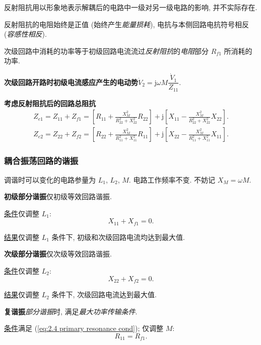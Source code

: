 反射阻抗用以形象地表示解耦后的电路中一级对另一级电路的影响, 并不实际存在.

反射阻抗的电阻始终是正值 (始终产生\textit{能量损耗}), 电抗与本侧回路电抗符号相反 (\textit{容感性相反}).

次级回路中消耗的功率等于初级回路电流流过\textit{反射阻抗}的\textit{电阻}部分 $R_{f1}$ 所消耗的功率.

\textbf{次级回路开路时初级电流感应产生的电动势}\quad $\dot{V}_2=\mathrm{j}\omega M\dfrac{\dot{V}_1}{Z_{11}}$.

\textbf{考虑反射阻抗后的回路总阻抗}
\begin{gather}
    Z_{e1}=Z_{11}+Z_{f1}=\left[R_{11}+\frac{X_M^2}{R_{22}^2+X_{22}^2}R_{22}\right]+\mathrm{j}\left[X_{11}-\frac{X_M^2}{R_{22}^2+X_{22}^2}X_{22}\right]. \\
    Z_{e2}=Z_{22}+Z_{f2}=\left[R_{22}+\frac{X_M^2}{R_{11}^2+X_{11}^2}R_{11}\right]+\mathrm{j}\left[X_{22}-\frac{X_M^2}{R_{11}^2+X_{11}^2}X_{11}\right].
\end{gather}

\subsubsection{耦合振荡回路的谐振}

调谐时可以变化的电路参量为 $L_1$, $L_2$, $M$. 电路工作频率不变. 不妨记 $X_M=\omega M$.

\textbf{初级部分谐振}\quad 仅初级等效回路谐振. \label{2.4 primary resonance}

\underline{条件}\quad 仅调整 $L_1$:
\begin{equation} \label{eq:2.4 primary resonance cond}
    X_{11}+X_{f1}=0.
\end{equation}

\underline{结果}\quad 仅调整 $L_1$ 条件下, 初级和次级回路电流均达到最大值.

\textbf{次级部分谐振}\quad 仅次级等效回路谐振. \label{2.4 secondary resonance}

\underline{条件}\quad 仅调整 $L_2$:
\begin{equation} \label{eq:2.4 secondary resonance cond}
    X_{22}+X_{f2}=0.
\end{equation}

\underline{结果}\quad 仅调整 $L_2$ 条件下, 次级回路电流达到最大值.

\textbf{复谐振}\quad \textit{部分谐振}时, 满足\textit{最大功率传输条件}. \label{2.4 complex resonance}

\question[单级回路谐振及最大功率传输条件能否保证另一级回路谐振]
\underline{条件}\quad 满足 (\ref{eq:2.4 primary resonance cond}); 仅调整 $M$:
\begin{equation} \label{eq:2.4 complex resonance power cond}
    R_{11}=R_{f1}.
\end{equation}


